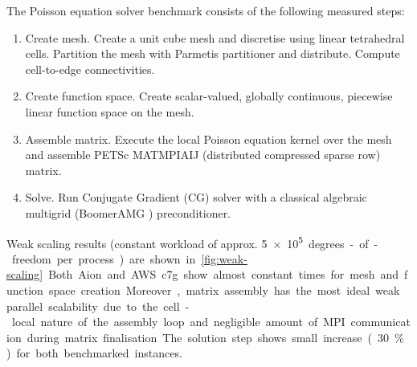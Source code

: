 The Poisson equation solver benchmark consists of the following measured
steps:
\begin{enumerate}
    \item Create mesh. Create a unit cube mesh and discretise using linear
    tetrahedral cells. Partition the mesh with Parmetis
    partitioner and distribute. Compute cell-to-edge connectivities.
    \item Create function space. Create scalar-valued, globally continuous,
    piecewise linear function space on the mesh.
    \item Assemble matrix. Execute the local Poisson equation kernel over
    the mesh and assemble PETSc MATMPIAIJ (distributed compressed sparse row)
    matrix.
    \item Solve. Run Conjugate Gradient (CG) solver with a classical algebraic
    multigrid (BoomerAMG \cite{hypre}) preconditioner.
\end{enumerate}
%
Weak scaling results (constant workload of approx. \SI{5e+5}
degrees-of-freedom per process) are shown in \autoref{fig:weak-scaling}.
Both Aion and AWS c7g show almost constant times for mesh and function
space creation. Moreover, matrix assembly has the most ideal weak parallel
scalability due to the cell-local nature of the assembly loop and negligible
amount of MPI communication during matrix finalisation. The solution step shows
small increase (30 \%) for both benchmarked instances.

